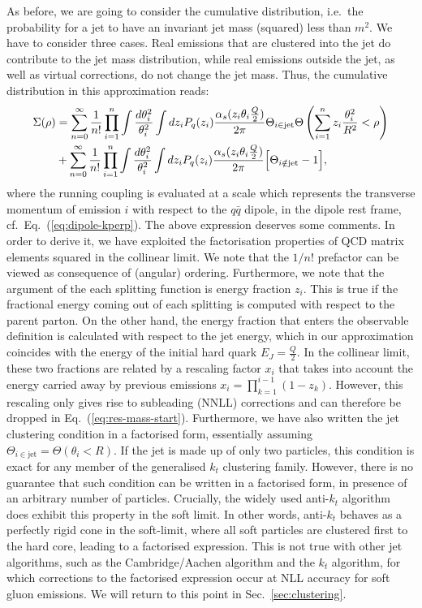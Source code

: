 As before, we are going to consider the cumulative distribution, i.e.\ the probability  for a jet to have an invariant jet mass (squared) less than $m^2$.
%
We have to consider three cases. Real emissions that are clustered into the jet do contribute to the jet mass distribution, while real emissions outside the jet, as well as virtual corrections, do not change the jet mass. Thus, the cumulative distribution in this approximation reads:
\begin{align}\label{eq:res-mass-start}
\Sigma(\rho)&=\sum_{n=0}^\infty \frac{1}{n!} \prod_{i=1}^n \int \frac{d \theta_i^2}{\theta_i^2} \int d z_i P_q(z_i) \frac{\alpha_s(z_i \theta_i \frac{Q}{2})}{2\pi}
\Theta_{i \in \text{jet}} \Theta \left(\sum_{i=1}^n z_i \frac{\theta_i^2}{R^2} < \rho \right) \nonumber \\&
+\sum_{n=0}^\infty \frac{1}{n!} \prod_{i=1}^n \int \frac{d \theta_i^2}{\theta_i^2} \int d z_i P_q(z_i) \frac{\alpha_s(z_i \theta_i \frac{Q}{2})}{2\pi}
\Big [\Theta_{i \notin \text{jet}}-1\Big],
\end{align}
where the running coupling is evaluated at a scale which represents
the transverse momentum of emission $i$ with respect to the $q \bar q$
dipole, in the dipole rest frame, cf.~Eq.~(\ref{eq:dipole-kperp}).
%
The above expression deserves some comments.
%
In order to derive it, we have exploited the factorisation properties of QCD matrix elements squared in the collinear limit. 
%
We note that the $1/n!$ prefactor can be viewed as consequence of (angular) ordering.
%
Furthermore, we note that the argument of the each splitting function is energy fraction $z_i$. This is true if the fractional energy coming out of each splitting is computed with respect to the parent parton.
%
On the other hand, the energy fraction that enters the observable definition is calculated with respect to the jet energy, which in our approximation coincides with the energy of the initial hard quark $E_J=\frac{Q}{2}$.
%
In the collinear limit, these two fractions are related by a rescaling
factor $x_i$ that takes into account the energy carried away by
previous emissions $x_i=\prod_{k=1}^{i-1}(1-z_{k})$. However, this
rescaling only gives rise to subleading (NNLL) corrections and can
therefore be dropped in Eq.~(\ref{eq:res-mass-start}).
%
Furthermore, we have also written the jet clustering condition in a factorised form, essentially assuming $\Theta_{i \in \text{jet}} =\Theta(\theta_i<R)$. 
%
If the jet is made up of only two particles, this condition is exact for any member of the generalised $k_t$ clustering family. However, there is no guarantee that such condition can be written in a factorised form, in presence of an arbitrary number of particles.
% 
Crucially, the widely used anti-$k_t$ algorithm does exhibit this
property in the soft limit. In other words, anti-$k_t$ behaves as a
perfectly rigid cone in the soft-limit, where all soft particles are
clustered first to the hard core, leading to a factorised
expression. This is not true with other jet algorithms, such as the
Cambridge/Aachen algorithm and the $k_t$ algorithm, for which
corrections to the factorised expression occur at NLL accuracy for
soft gluon emissions. We
will return to this point in Sec.~\ref{sec:clustering}.


